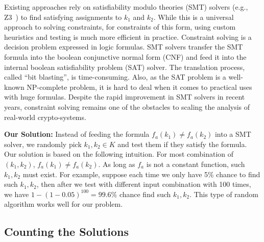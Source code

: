 Existing approaches rely on satisfiability modulo theories (SMT) solvers 
(e.g., Z3~\cite{DeMoura:2008:ZES:1792734.1792766}) to find satisfying assignments to
$k_1$ and $k_2$.
While this is a universal approach to solving constraints, 
for constraints of this form, using custom 
heuristics and testing is much more efficient in practice. Constraint 
solving is a decision problem expressed in logic formulas. SMT solvers 
transfer the SMT formula into the boolean conjunctive normal 
form (CNF) and feed it into the internal boolean satisfiability 
problem (SAT) solver. The translation process, called ``bit blasting'', 
is time-consuming. Also, as the SAT problem is a well-known NP-complete 
problem, it is hard to deal when it comes to
practical uses with huge formulas. Despite the rapid improvement 
in SMT solvers in recent years, constraint solving remains one of 
the obstacles to scaling the analysis of real-world crypto-systems.

\textbf{Our Solution:}
Instead of feeding the formula $f_a(k_1) \neq f_a(k_2)$ into a SMT solver, we
randomly pick $k_1, k_2 \in K$ and test them if they satisfy the
formula. Our solution is based on the following intuition. For most combination
of $(k_{1}, k_{2} )$, $f_a(k_1) \neq f_a(k_2)$. As long as
$f_a$ is not a constant function, such $k_1, k_2$ must exist. For example,
suppose each time we only have 5\% chance to find such $k_1, k_2$, then after we
test with different input combination with 100 times, we have $1 -
(1-0.05)^{100} = 99.6\%$ chance find such $k_1, k_2$. This type of random algorithm
works well for our problem.

\subsection{Counting the Solutions}
\label{MCreasons}


